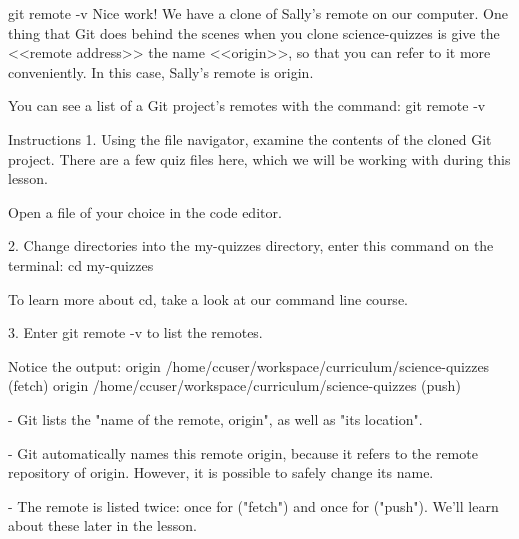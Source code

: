 git remote -v
    Nice work! We have a clone of Sally’s remote on our computer. One thing that Git does behind the scenes when you clone science-quizzes is give the <<remote address>> the name <<origin>>, so that you can refer to it more conveniently. In this case, Sally’s remote is origin.

    You can see a list of a Git project’s remotes with the command:
        git remote -v

Instructions
    1.
    Using the file navigator, examine the contents of the cloned Git project. There are a few quiz files here, which we will be working with during this lesson.

    Open a file of your choice in the code editor.

    2.
    Change directories into the my-quizzes directory, enter this command on the terminal:
        cd my-quizzes
    
    To learn more about cd, take a look at our command line course.

    3.
    Enter git remote -v to list the remotes.

    Notice the output:
        origin    /home/ccuser/workspace/curriculum/science-quizzes (fetch)
        origin    /home/ccuser/workspace/curriculum/science-quizzes (push)
    
        - Git lists the "name of the remote, origin", as well as "its location".
        
        - Git automatically names this remote origin, because it refers to the remote repository of origin. However, it is possible to safely change its name.
    
        - The remote is listed twice: once for ("fetch") and once for ("push"). We’ll learn about these later in the lesson.